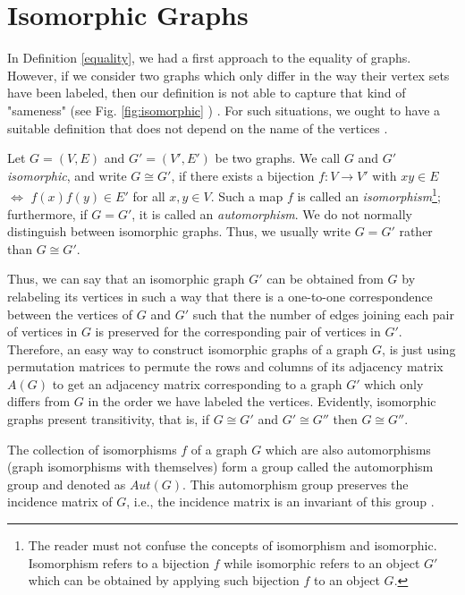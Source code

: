 \section{Isomorphic Graphs}
\label{isomorphic}
In Definition \ref{equality}, we had a first approach to the equality of 
graphs. However, if we consider two graphs which only differ in the way 
their vertex sets have been labeled, then our definition is not able to 
capture that kind of "sameness" (see Fig. \ref{fig:isomorphic} ) \cite{trudeau}. For such 
situations, we ought to have a suitable definition that does not depend 
on the name of the vertices \cite{diestel}.

\begin{defn}
        Let $G=(V,E)$ and $G'=(V',E')$ be two graphs. We call $G$ and $G'$ 
\textit{isomorphic}, and write $G \cong G'$, if there exists a bijection 
$f: V \rightarrow V'$ with $xy\in E$ $\Leftrightarrow$ $f(x)f(y) \in E'$ 
for all $x,y \in V$. Such a map $f$ is called an \textit{isomorphism}\footnote{The reader must not confuse the concepts of isomorphism and isomorphic. Isomorphism refers to a bijection $f$ while isomorphic refers to an object $G'$ which can be obtained by applying such bijection $f$ to an object $G$.}; 
furthermore, if $G=G'$, it is called an \textit{automorphism}. We do not normally 
distinguish between isomorphic graphs. Thus, we usually write $G=G'$ 
rather than $G \cong G'$.
\end{defn}

Thus, we can say that an isomorphic graph $G'$ can be obtained from $G$ by relabeling its vertices in such a way that there is a one-to-one correspondence between the vertices of $G$ and $G'$ such that the number of edges joining each pair of vertices in $G$ is preserved for the corresponding pair of vertices in $G'$. Therefore, an easy way to construct isomorphic graphs of a graph $G$, is just using permutation matrices to permute the rows and columns of its adjacency matrix $A(G)$  to get an adjacency matrix corresponding to a graph $G'$ which only differs from $G$ in the order we have labeled the vertices. Evidently, isomorphic graphs present transitivity, that is, if $G \cong G'$ and $G' \cong G''$ then $G \cong G''$.

The collection of isomorphisms $f$ of a graph $G$ which are also automorphisms (graph isomorphisms with themselves) form a group called the automorphism group and denoted as $Aut(G)$. This automorphism group preserves the incidence matrix of $G$, i.e., the incidence matrix is an invariant of this group \cite{automorphism}.

